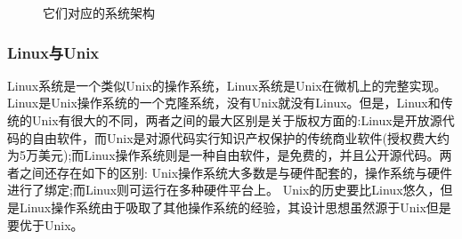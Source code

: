 \documentclass{article}
\begin{document}
\begin{figure}[H]
\centering
{}
\caption{它们对应的系统架构}
\end{figure}
\subsubsection{Linux与Unix}\par
Linux系统是一个类似Unix的操作系统，Linux系统是Unix在微机上的完整实现。Linux是Unix操作系统的一个克隆系统，没有Unix就没有Linux。但是，Linux和传统的Unix有很大的不同，两者之间的最大区别是关于版权方面的:Linux是开放源代码的自由软件，而Unix是对源代码实行知识产权保护的传统商业软件(授权费大约为5万美元);而Linux操作系统则是一种自由软件，是免费的，并且公开源代码。两者之间还存在如下的区别: Unix操作系统大多数是与硬件配套的，操作系统与硬件进行了绑定;而Linux则可运行在多种硬件平台上。
Unix的历史要比Linux悠久，但是Linux操作系统由于吸取了其他操作系统的经验，其设计思想虽然源于Unix但是要优于Unix。\par
\end{document}

